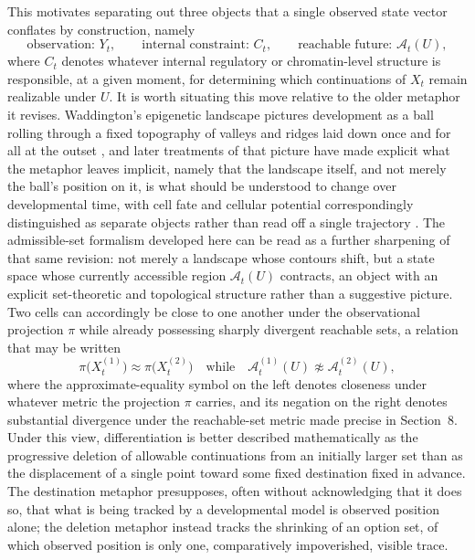 \documentclass[11pt]{article}
\begin{document}
This motivates separating out three objects that a single observed state vector conflates by construction, namely
\begin{equation}
\text{observation: } Y_t, \qquad \text{internal constraint: } C_t, \qquad \text{reachable future: } \mathcal{A}_t(U),
\end{equation}
where $C_t$ denotes whatever internal regulatory or chromatin-level structure is responsible, at a given moment, for determining which continuations of $X_t$ remain realizable under $U$. It is worth situating this move relative to the older metaphor it revises. Waddington's epigenetic landscape pictures development as a ball rolling through a fixed topography of valleys and ridges laid down once and for all at the outset \cite{waddington1957}, and later treatments of that picture have made explicit what the metaphor leaves implicit, namely that the landscape itself, and not merely the ball's position on it, is what should be understood to change over developmental time, with cell fate and cellular potential correspondingly distinguished as separate objects rather than read off a single trajectory \cite{moris2016}. The admissible-set formalism developed here can be read as a further sharpening of that same revision: not merely a landscape whose contours shift, but a state space whose currently accessible region $\mathcal{A}_t(U)$ contracts, an object with an explicit set-theoretic and topological structure rather than a suggestive picture. Two cells can accordingly be close to one another under the observational projection $\pi$ while already possessing sharply divergent reachable sets, a relation that may be written
\begin{equation}
\pi\bigl(X_t^{(1)}\bigr) \approx \pi\bigl(X_t^{(2)}\bigr) \quad \text{while} \quad \mathcal{A}_t^{(1)}(U) \not\approx \mathcal{A}_t^{(2)}(U),
\end{equation}
where the approximate-equality symbol on the left denotes closeness under whatever metric the projection $\pi$ carries, and its negation on the right denotes substantial divergence under the reachable-set metric made precise in Section~8. Under this view, differentiation is better described mathematically as the progressive deletion of allowable continuations from an initially larger set than as the displacement of a single point toward some fixed destination fixed in advance. The destination metaphor presupposes, often without acknowledging that it does so, that what is being tracked by a developmental model is observed position alone; the deletion metaphor instead tracks the shrinking of an option set, of which observed position is only one, comparatively impoverished, visible trace.
\end{document}
